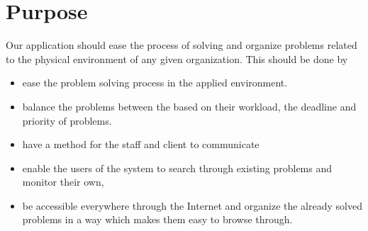 \section{Purpose}
Our application should ease the process of solving and organize problems related to the physical environment of any given organization. This should be done by
\begin{itemize}
\item ease the problem solving process in the applied environment. 
\item balance the problems between the \astaff[] based on their workload, the deadline and priority of problems.
\item have a method for the staff and client to communicate
\item enable the users of the system to search through existing problems and monitor their own, 
\item be accessible everywhere through the Internet and organize the already solved problems in a way which makes them easy to browse through.
\end{itemize}
